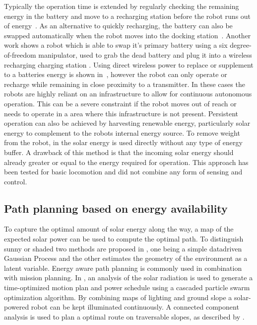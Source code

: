 \documentclass[letterpaper, 10 pt, conference]{ieeeconf}  %
\begin{document}
Typically the operation time is extended by regularly checking the remaining energy in the battery and move to a recharging station before the robot runs out of energy~\cite{pickem_icra_2015, rubenstein_icra_2012}.
As an alternative to quickly recharging, the battery can also be swapped automatically when the robot moves into the docking station~\cite{kemal_mech_2015}.
Another work shows a robot which is able to swap it's primary battery using a six degree-of-freedom manipulator, used to grab the dead battery and plug it into a wireless recharging charging station \cite{zhang_conel_2013}.
Using direct wireless power to replace or supplement to a batteries energy is shown in~\cite{karpelson_icra_2014}, however the robot can only operate or recharge while remaining in close proximity to a transmitter. 
In these cases the robots are highly reliant on an infrastructure to allow for continuous autonomous operation.
This can be a severe constraint if the robot moves out of reach or needs to operate in a area where this infrastructure is not present. Persistent operation can also be achieved by harvesting renewable energy, particularly solar energy to complement to the robots internal energy source. To remove weight from the robot, in \cite{bruhwiler_iros_2015} the solar energy is used directly without any type of energy buffer. A drawback of this method is that the incoming solar energy should already greater or equal to the energy required for operation. This approach has been tested for basic locomotion and did not combine any form of sensing and control.

\subsection{Path planning based on energy availability}

To capture the optimal amount of solar energy along the way, a map of the expected solar power can be used to compute the optimal path. To distinguish sunny or shaded two methods are proposed in \cite{plonski_tranro_2016}, one being a simple datadriven Gaussian Process and the other estimates the geometry of the environment as a latent variable.
Energy aware path planning is commonly used in combination with mission planning.
In \cite{kaplan_iros_2016}, an analysis of the solar radiation is used to generate a time-optimized motion plan and power schedule using a cascaded particle swarm optimization algorithm.
By combining maps of lighting and ground slope a solar-powered robot can be kept illuminated continuously. A connected component analysis is used to plan a optimal route on traversable slopes, as described by \cite{otten_icra_2015}.
\end{document}
